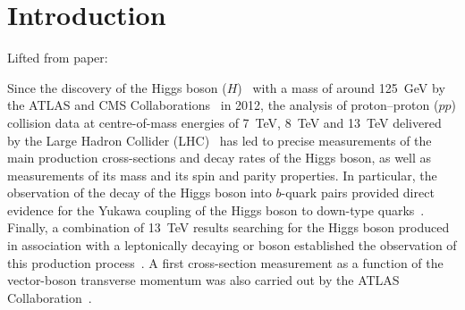 \section{Introduction}

Lifted from paper:

Since the discovery of the Higgs boson
($H$)~\cite{Englert:1964et,Higgs:1964ia,Higgs:1964pj,Guralnik:1964eu}
with a mass of around \SI{125}{\GeV}\cite{HIGG-2014-14} by the ATLAS
and CMS Collaborations~\cite{HIGG-2012-27,CMS-HIG-12-028} in 2012,
the analysis of proton--proton ($pp$) collision data at centre-of-mass
energies of \SI{7}{TeV}, \SI{8}{TeV} and \SI{13}{\TeV} delivered by the Large Hadron
Collider (LHC)~\cite{Evans:2008zzb} has led to precise
measurements of the main production cross-sections and decay rates of
the Higgs boson, as well as measurements of its mass and its spin and
parity properties. In particular, the observation of the decay of the
Higgs boson into $b$-quark pairs provided direct evidence for the
Yukawa coupling of the Higgs boson to down-type
quarks~\cite{HIGG-2018-04,CMS-HIG-18-016}.  Finally, a combination
of \SI{13}{\TeV} results searching for the Higgs boson produced in
association with a leptonically decaying \Wboson or \Zboson boson established
the observation of this production process~\cite{HIGG-2018-04}.
A first cross-section measurement as a
function of the vector-boson transverse momentum was also carried out
by the ATLAS Collaboration~\cite{HIGG-2018-50}.






